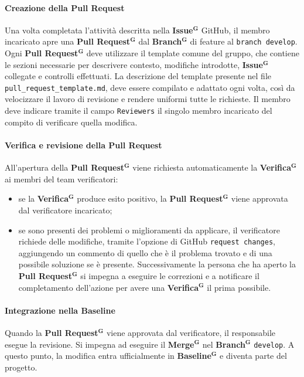 \documentclass[a4paper,12pt]{article}
\newcommand{\term}[1]{\textbf{#1}$^\mathbf{G}$}
\newcommand{\ignoreglossary}{}
\begin{document}
\paragraph{Creazione della \ignoreglossary{Pull Request}}
Una volta completata l’attività descritta nella \term{Issue} GitHub, il membro incaricato apre una \term{Pull Request} dal \term{Branch} di feature al \texttt{branch develop}.\\ Ogni \term{Pull Request} deve utilizzare il template comune del gruppo, che contiene le sezioni necessarie per descrivere contesto, modifiche introdotte, \term{Issue} collegate e controlli effettuati. La descrizione del template presente nel file \texttt{pull\_request\_template.md}, deve essere compilato e adattato ogni volta, così da velocizzare il lavoro di revisione e rendere uniformi tutte le richieste. Il membro deve indicare tramite il campo \texttt{Reviewers} il singolo membro incaricato del compito di verificare quella modifica.

\paragraph{\ignoreglossary{Verifica} e revisione della \ignoreglossary{Pull Request}}
All'apertura della \term{Pull Request} viene richiesta automaticamente la \term{Verifica} ai membri del team verificatori:
\begin{itemize}
    \item se la \term{Verifica} produce esito positivo, la \term{Pull Request} viene approvata dal verificatore incaricato;
    \item se sono presenti dei problemi o miglioramenti da applicare, il verificatore richiede delle modifiche, tramite l'opzione di GitHub \texttt{request changes}, aggiungendo un commento di quello che è il problema trovato e di una possibile soluzione se è presente. Successivamente la persona che ha aperto la \term{Pull Request} si impegna a eseguire le correzioni e a notificare il completamento dell'azione per avere una \term{Verifica} il prima possibile.
\end{itemize}

\paragraph{Integrazione nella \ignoreglossary{Baseline}}
Quando la \term{Pull Request} viene approvata dal verificatore, il responsabile esegue la revisione. Si impegna ad eseguire il \term{Merge} nel \term{Branch} \texttt{develop}. A questo punto, la modifica entra ufficialmente in \term{Baseline} e diventa parte del progetto.
\end{document}
